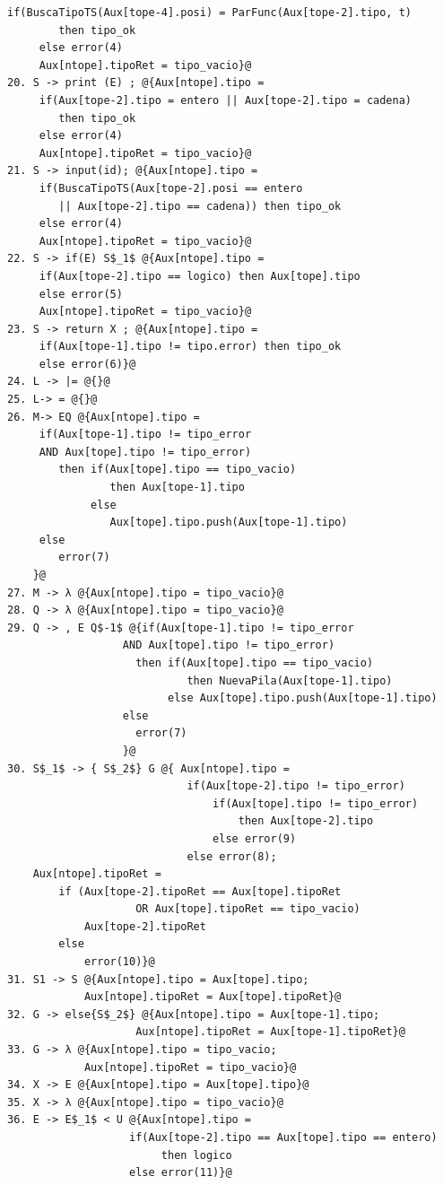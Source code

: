 \documentclass[a4paper, 12pt]{article}
\begin{document}
\begin{lstlisting}[style=EdT]
     if(BuscaTipoTS(Aux[tope-4].posi) = ParFunc(Aux[tope-2].tipo, t)
        then tipo_ok
     else error(4)
     Aux[ntope].tipoRet = tipo_vacio}@
20. S -> print (E) ; @{Aux[ntope].tipo =
     if(Aux[tope-2].tipo = entero || Aux[tope-2].tipo = cadena)
        then tipo_ok
     else error(4)
     Aux[ntope].tipoRet = tipo_vacio}@
21. S -> input(id); @{Aux[ntope].tipo =
     if(BuscaTipoTS(Aux[tope-2].posi == entero
        || Aux[tope-2].tipo == cadena)) then tipo_ok
     else error(4)
     Aux[ntope].tipoRet = tipo_vacio}@
22. S -> if(E) S$_1$ @{Aux[ntope].tipo =
     if(Aux[tope-2].tipo == logico) then Aux[tope].tipo
     else error(5)
     Aux[ntope].tipoRet = tipo_vacio}@
23. S -> return X ; @{Aux[ntope].tipo =
     if(Aux[tope-1].tipo != tipo.error) then tipo_ok
     else error(6)}@
24. L -> |= @{}@
25. L-> = @{}@
26. M-> EQ @{Aux[ntope].tipo =
     if(Aux[tope-1].tipo != tipo_error
     AND Aux[tope].tipo != tipo_error)
        then if(Aux[tope].tipo == tipo_vacio)
                then Aux[tope-1].tipo
             else
                Aux[tope].tipo.push(Aux[tope-1].tipo)
     else
        error(7)
    }@
27. M -> λ @{Aux[ntope].tipo = tipo_vacio}@
28. Q -> λ @{Aux[ntope].tipo = tipo_vacio}@
29. Q -> , E Q$-1$ @{if(Aux[tope-1].tipo != tipo_error
                  AND Aux[tope].tipo != tipo_error)
                    then if(Aux[tope].tipo == tipo_vacio)
                            then NuevaPila(Aux[tope-1].tipo)
                         else Aux[tope].tipo.push(Aux[tope-1].tipo)
                  else
                    error(7)
                  }@
30. S$_1$ -> { S$_2$} G @{ Aux[ntope].tipo =
                            if(Aux[tope-2].tipo != tipo_error)
                                if(Aux[tope].tipo != tipo_error)
                                    then Aux[tope-2].tipo
                                else error(9)
                            else error(8);
	Aux[ntope].tipoRet =
		if (Aux[tope-2].tipoRet == Aux[tope].tipoRet 
					OR Aux[tope].tipoRet == tipo_vacio)
			Aux[tope-2].tipoRet
		else 
			error(10)}@
31. S1 -> S @{Aux[ntope].tipo = Aux[tope].tipo;
			Aux[ntope].tipoRet = Aux[tope].tipoRet}@
32. G -> else{S$_2$} @{Aux[ntope].tipo = Aux[tope-1].tipo;
					Aux[ntope].tipoRet = Aux[tope-1].tipoRet}@
33. G -> λ @{Aux[ntope].tipo = tipo_vacio;
			Aux[ntope].tipoRet = tipo_vacio}@
34. X -> E @{Aux[ntope].tipo = Aux[tope].tipo}@
35. X -> λ @{Aux[ntope].tipo = tipo_vacio}@
36. E -> E$_1$ < U @{Aux[ntope].tipo =
                   if(Aux[tope-2].tipo == Aux[tope].tipo == entero)
                        then logico
                   else error(11)}@

\end{lstlisting}
\end{document}
